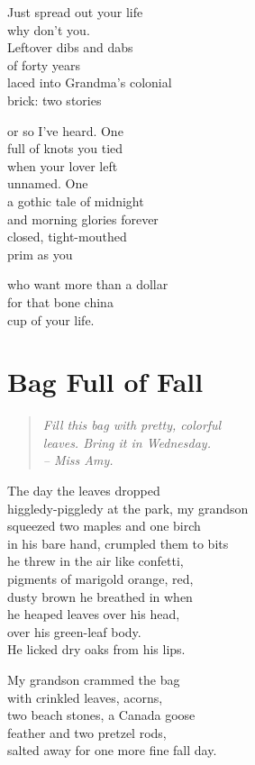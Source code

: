 \documentclass[twoside,10pt]{book}
\begin{document}
Just spread out your life\\
why don't you.\\
Leftover dibs and dabs\\
of forty years\\
laced into Grandma's colonial\\
brick: two stories

or so I've heard. One\\
full of knots you tied\\
when your lover left\\
unnamed. One\\
a gothic tale of midnight\\
and morning glories forever\\
closed, tight-mouthed\\
prim as you

who want more than a dollar\\
for that bone china\\
cup of your life.

\clearpage
\section{Bag Full of Fall}

\begin{quote}
\emph{Fill this bag with pretty, colorful\\
leaves. Bring it in Wednesday.\\
\mbox{}\qquad\qquad\qquad\qquad -- Miss Amy.}
\end{quote}

The day the leaves dropped\\
higgledy-piggledy at the park, my grandson\\
squeezed two maples and one birch\\
in his bare hand, crumpled them to bits\\
he threw in the air like confetti,\\
pigments of marigold orange, red,\\
dusty brown he breathed in when\\
he heaped leaves over his head,\\
over his green-leaf body.\\
He licked dry oaks from his lips.

My grandson crammed the bag\\
with crinkled leaves, acorns,\\
two beach stones, a Canada goose\\
feather and two pretzel rods,\\
salted away for one more fine fall day.
\end{document}
